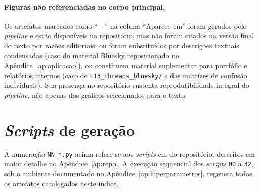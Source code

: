 \paragraph{Figuras n\~ao referenciadas no corpo principal.} Os artefatos
marcados como ``---'' na coluna ``Aparece em'' foram gerados pelo
\emph{pipeline} e est\~ao dispon\'iveis no reposit\'orio, mas n\~ao
foram citados na vers\~ao final do texto por raz\~oes editoriais:
ou foram substitu\'idos por descri\c{c}\~oes textuais condensadas (caso
do material Bluesky reposicionado no Ap\^endice~\ref{ap:aplicacao}),
ou constituem material suplementar para portf\'olio e relat\'orios
internos (caso de \texttt{F13\_threads\_bluesky/} e das matrizes de
confus\~ao individuais). Sua presen\c{c}a no reposit\'orio sustenta
reprodutibilidade integral do \emph{pipeline}, n\~ao apenas dos
gr\'aficos selecionados para o texto.

\section{\emph{Scripts} de gera\c{c}\~ao}
\label{sec:ap_scripts}

A numera\c{c}\~ao \texttt{NN\_*.py} acima refere-se aos \emph{scripts}
em  do reposit\'orio, descritos
em maior detalhe no Ap\^endice~\ref{ap:repo}. A execu\c{c}\~ao
sequencial dos \emph{scripts} \texttt{00} a \texttt{32}, sob o ambiente
documentado no Ap\^endice~\ref{ap:hiperparametros}, regenera todos os
artefatos catalogados neste \'indice.
